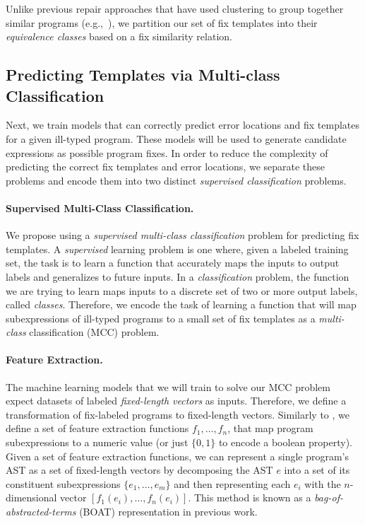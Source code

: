 Unlike previous repair approaches that have used clustering to group together
similar programs (e.g.,~\citep{Wang_2018, Gulwani_2018}), we partition our set of
fix templates into their \emph{equivalence classes} based on a fix similarity
relation.


\subsection{Predicting Templates via Multi-class Classification}
\label{sec:overview:predict}

Next, we train models that can correctly predict error locations and fix
templates for a given ill-typed program. These models will be used to generate
candidate expressions as possible program fixes. In order to reduce the
complexity of predicting the correct fix templates and error locations, we
separate these problems and encode them into two distinct \emph{supervised
classification} problems.

\paragraph{Supervised Multi-Class Classification.}
We propose using a \emph{supervised multi-class classification} problem for
predicting fix templates. A \emph{supervised} learning problem is one where,
given a labeled training set, the task is to learn a function that accurately
maps the inputs to output labels and generalizes to future inputs. In a
\emph{classification} problem, the function we are trying to learn maps inputs
to a discrete set of two or more output labels, called \emph{classes}.
Therefore, we encode the task of learning a function that will map
subexpressions of ill-typed programs to a small set of fix templates as a
\emph{multi-class} classification (MCC) problem.

\paragraph{Feature Extraction.} The machine learning models that we will train
to solve our MCC problem expect datasets of labeled \emph{fixed-length vectors}
as inputs. Therefore, we define a transformation of fix-labeled programs to
fixed-length vectors. Similarly to \citep{Seidel:2017}, we define a set of
feature extraction functions $f_1, \ldots, f_n$, that map program subexpressions
to a numeric value (or just $\{0, 1\}$ to encode a boolean property). Given a
set of feature extraction functions, we can represent a single program's AST as
a set of fixed-length vectors by decomposing the AST $e$ into a set of its
constituent subexpressions $\{e_1, \ldots, e_m\}$ and then representing each
$e_i$ with the $n$-dimensional vector $[f_1(e_i), \ldots, f_n(e_i)]$. This
method is known as a \emph{bag-of-abstracted-terms} (BOAT) representation in
previous work.

